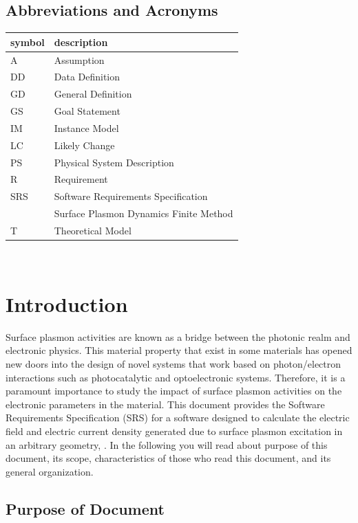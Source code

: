 \documentclass[12pt]{article}
\begin{document}
	
	\subsection{Abbreviations and Acronyms}
	
	\renewcommand{\arraystretch}{1.2} \begin{tabular}{l l} \toprule \textbf{symbol}
		& \textbf{description}\\ \midrule A & Assumption\\ DD & Data Definition\\ GD &
		General Definition\\ GS & Goal Statement\\ IM & Instance Model\\ LC & Likely
		Change\\ PS & Physical System Description\\ R & Requirement\\ SRS & Software
		Requirements Specification\\ \progname{} & Surface Plasmon Dynamics Finite
		Method\\ T & Theoretical Model\\ \bottomrule \end{tabular}\\
	
	
	\newpage
	
	
	\section{Introduction}
	
	Surface plasmon activities are known as a bridge between the photonic realm and
	electronic physics. This material property that exist in some materials has
	opened new doors into the design of novel systems that work based on
	photon/electron interactions such as photocatalytic and optoelectronic systems.
	Therefore, it is a paramount importance to study the impact of surface plasmon
	activities on the electronic parameters in the material. This document provides
	the Software Requirements Specification (SRS) for a software designed to
	calculate the electric field and electric current density generated due to
	surface plasmon excitation in an arbitrary geometry, \progname{}. In the
	following you will read about purpose of this document, its scope,
	characteristics of those who read this document, and its general organization.
	
	
	\subsection{Purpose of Document}
	
\end{document}
